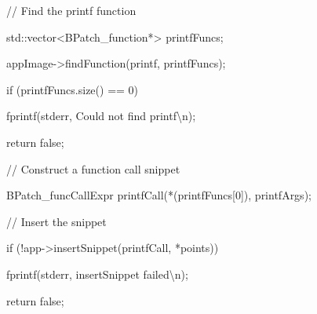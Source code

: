 {{{{{{{{{

// Find the printf function}



{

std::vector<BPatch_function*> printfFuncs;}



{

appImage->findFunction({\textquotedbl}printf{\textquotedbl}, printfFuncs);}



{

if (printfFuncs.size() == 0) {}



{

fprintf(stderr, {\textquotedbl}Could not find printf{\textbackslash}n{\textquotedbl});}



{

return false;}



{

}}





\bigskip



{

// Construct a function call snippet}



{

BPatch_funcCallExpr printfCall(*(printfFuncs[0]), printfArgs);}





\bigskip



{

// Insert the snippet}



{

if (!app->insertSnippet(printfCall, *points)) {}



{

fprintf(stderr, {\textquotedbl}insertSnippet failed{\textbackslash}n{\textquotedbl});}



{

return false;}



{

}}



{

}}}}}}}}}
